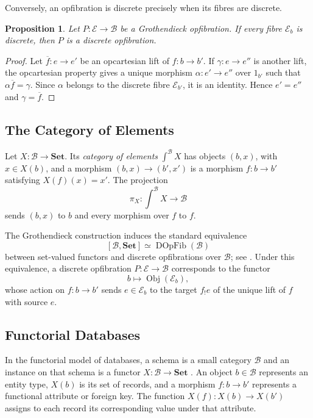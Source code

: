 \documentclass[12pt]{amsart}
\newtheorem{prop}[teo]{Proposition}
\theoremstyle{definition}
\theoremstyle{remark}
\numberwithin{figure}{section}%
\newcommand{\Ba}{\mathcal{B}}
\newcommand{\E}{\mathcal{E}}
\newcommand{\Sets}{\mathbf{Set}}
\begin{document}
Conversely, an opfibration is discrete precisely when its fibres are
discrete.

\begin{prop}\label{prop:discrete_fibres_discrete_opfibration}
Let \(P\colon\E\to\Ba\) be a Grothendieck opfibration. If every fibre
\(\E_b\) is discrete, then \(P\) is a discrete opfibration.
\end{prop}

\begin{proof}
Let \(\overline f\colon e\to e'\) be an opcartesian lift of
\(f\colon b\to b'\). If \(\gamma\colon e\to e''\) is another lift, the
opcartesian property gives a unique morphism
\(\alpha\colon e'\to e''\) over \(1_{b'}\) such that
\(\alpha\overline f=\gamma\). Since \(\alpha\) belongs to the discrete
fibre \(\E_{b'}\), it is an identity. Hence
\(e'=e''\) and \(\gamma=\overline f\).
\end{proof}

\subsection{The Category of Elements}

Let \(X\colon\Ba\to\Sets\). Its \emph{category of elements}
\(\int^\Ba X\) has objects \((b,x)\), with \(x\in X(b)\), and a morphism
\((b,x)\to(b',x')\) is a morphism \(f\colon b\to b'\) satisfying
\(X(f)(x)=x'\). The projection
\[
\pi_X\colon\int^\Ba X\longrightarrow\Ba
\]
sends \((b,x)\) to \(b\) and every morphism over \(f\) to \(f\).

The Grothendieck construction induces the standard equivalence
\[
[\Ba,\Sets]\simeq\operatorname{DOpFib}(\Ba)
\]
between set-valued functors and discrete opfibrations over \(\Ba\); see
\cite{RiehlLoregianFibration,SpivakDataMigration}. Under this equivalence,
a discrete opfibration \(P\colon\E\to\Ba\) corresponds to the functor
\[
b\longmapsto\operatorname{Obj}(\E_b),
\]
whose action on \(f\colon b\to b'\) sends \(e\in\E_b\) to the target
\(f_!e\) of the unique lift of \(f\) with source \(e\).

\subsection{Functorial Databases}

In the functorial model of databases, a schema is a small category \(\Ba\)
and an instance on that schema is a functor
\(X\colon\Ba\to\Sets\)
\cite{SevenSketches,SpivakDataMigration,SpivakDatabaseQueries}. An object
\(b\in\Ba\) represents an entity type, \(X(b)\) is its set of records, and
a morphism \(f\colon b\to b'\) represents a functional attribute or foreign
key. The function \(X(f)\colon X(b)\to X(b')\) assigns to each record its
corresponding value under that attribute.
\end{document}
